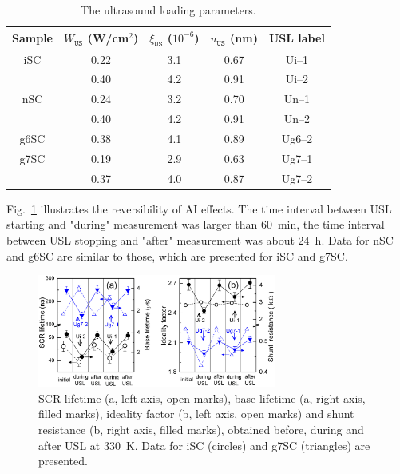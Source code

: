 \documentclass[aip,jap, amsmath,amssymb,reprint]{revtex4-1}
\begin{document}
\begin{table}
\caption{\label{tabUSL}The ultrasound loading parameters.
}
\begin{ruledtabular}
\begin{tabular}{ccccc}
Sample&$W_{\mathtt{US}}$ (W/cm$^2$)&$\xi_{\mathtt{US}}$ ($10^{-6}$)&$u_{\mathtt{US}}$ (nm)&USL label\\
\hline
iSC&0.22&3.1&0.67&Ui--1\\
&0.40&4.2&0.91&Ui--2\\
nSC&0.24&3.2&0.70&Un--1\\
&0.40&4.2&0.91&Un--2\\
g6SC&0.38&4.1&0.89&Ug6--2\\
g7SC&0.19&2.9&0.63&Ug7--1\\
&0.37&4.0&0.87&Ug7--2\\
\end{tabular}
\end{ruledtabular}
\end{table}

Fig.~\ref{fig_Reverse} illustrates the reversibility of AI effects.
The time interval between USL starting and "during" measurement was larger than 60~min,
the time interval between USL stopping and "after" measurement was about 24~h.
Data for nSC and g6SC are similar to those, which are presented for iSC and g7SC.

\begin{figure}
\includegraphics[width=0.7\textwidth]{olikhFigRel}%
\caption{\label{fig_Reverse}
SCR lifetime (a, left axis, open marks),
base lifetime (a, right axis, filled marks),
ideality factor (b, left axis, open marks) and
shunt resistance (b, right axis, filled marks),
obtained before, during and after USL at 330~K.
Data for iSC (circles) and g7SC (triangles) are presented.
}%
\end{figure}
\end{document}

